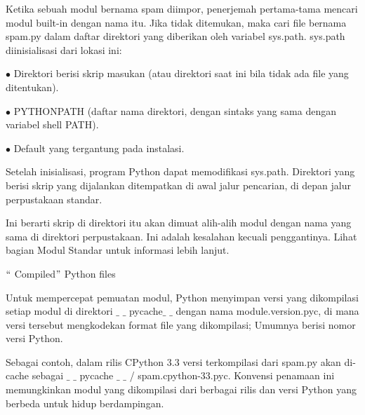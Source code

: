 \noindent Ketika sebuah modul bernama spam diimpor, penerjemah pertama-tama mencari modul built-in dengan nama itu. Jika tidak ditemukan, maka cari file bernama spam.py dalam daftar direktori yang diberikan oleh variabel sys.path. sys.path diinisialisasi dari lokasi ini:\par

\vspace{\baselineskip}
\noindent $\bullet$  Direktori berisi skrip masukan (atau direktori saat ini bila tidak ada file yang ditentukan).\par
\vspace{\baselineskip}
\noindent $\bullet$  PYTHONPATH (daftar nama direktori, dengan sintaks yang sama dengan variabel shell PATH).\par
\vspace{\baselineskip}
\noindent $\bullet$  Default yang tergantung pada instalasi.\par

\vspace{\baselineskip}
\noindent Setelah inisialisasi, program Python dapat memodifikasi sys.path. Direktori yang berisi skrip yang dijalankan ditempatkan di awal jalur pencarian, di depan jalur perpustakaan standar.\par  
\vspace{\baselineskip}
\noindent Ini berarti skrip di direktori itu akan dimuat alih-alih modul dengan nama yang sama di direktori perpustakaan. Ini adalah kesalahan kecuali penggantinya. Lihat bagian Modul Standar untuk informasi lebih lanjut.\par


\vspace{\baselineskip}
\noindent $``$ Compiled$"$  Python files\par


\noindent Untuk mempercepat pemuatan modul, Python menyimpan versi yang dikompilasi setiap modul di direktori $ \_ $ $ \_ $ pycache$ \_ $ $ \_ $  dengan nama module.version.pyc, di mana versi tersebut mengkodekan format file yang dikompilasi; Umumnya berisi nomor versi Python.\par
\vspace{\baselineskip} 
\noindent Sebagai contoh, dalam rilis CPython 3.3 versi terkompilasi dari spam.py akan di-cache sebagai $ \_ $ $ \_ $ pycache $ \_ $ $ \_ $  / spam.cpython-33.pyc. Konvensi penamaan ini memungkinkan modul yang dikompilasi dari berbagai rilis dan versi Python yang berbeda untuk hidup berdampingan. \par

